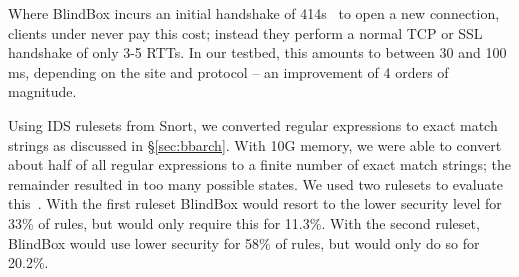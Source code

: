  Where BlindBox incurs an initial handshake of 414s~\cite{blindbox} to open a new connection, clients under \sys never pay this cost; instead they perform a normal TCP or SSL handshake of only 3-5 RTTs. In our testbed, this amounts to between 30 and 100 ms, depending on the site and protocol -- an improvement of 4 orders of magnitude.

Using IDS rulesets from Snort, we converted regular expressions to exact match strings as discussed in \S\ref{sec:bbarch}. With 10G memory, we were able to convert about half of all regular expressions to a finite number of exact match strings; the remainder resulted in too many possible states. 
We used two rulesets to evaluate this~\cite{emergingthreats, snort-community}. With the first ruleset BlindBox would resort to the lower security level for 33\% of rules, but \sys would only require this for 11.3\%.
With the second ruleset, BlindBox would use lower security for 58\% of rules, but \sys would only do so for 20.2\%.


